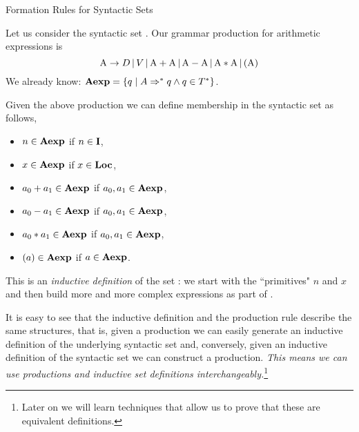 \documentclass{beamer}
\begin{document}

\begin{frame}{Formation Rules for Syntactic Sets}
\scriptsize

Let us consider the syntactic set .  Our grammar production for arithmetic expressions is
\[
\mbox{A} \rightarrow D \,|\, V \,|\, \mbox{A} +\mbox{A} \,|\, \mbox{A} - \mbox{A} \,|\,
	\mbox{A} * \mbox{A}\,|\, ( \mbox{A} )
\]
We already know: $\mbox{\bf Aexp} = \{ q \mid A \Rightarrow^* q \wedge q \in T^*\}$.

\vspace{.1in}
Given the above production we can define membership in the syntactic set as follows,
\begin{minipage}[t]{2in}
\begin{itemize}
\item $n \in  \mbox{\bf Aexp}$ if $n \in \mbox{\bf I}$,
\item $x \in \mbox{\bf Aexp}$ if $x\in \mbox{\bf Loc}$,
\item $a_0 + a_1 \in \mbox{\bf Aexp}$ if $a_0, a_1 \in \mbox{\bf Aexp}$,
\end{itemize}
\end{minipage}
\begin{minipage}[t]{2in}
\begin{itemize}
\item $a_0 - a_1 \in \mbox{\bf Aexp}$ if $a_0, a_1 \in \mbox{\bf Aexp}$,
\item $a_0 * a_1 \in \mbox{\bf Aexp}$ if $a_0, a_1 \in \mbox{\bf Aexp}$,
\item $( a )\in \mbox{\bf Aexp}$ if $a \in \mbox{\bf Aexp}$.
\end{itemize}
\end{minipage}

\vspace{.1in}

This is an {\em inductive definition} of the set : we start with the ``primitives" $n$ and
$x$ and then build more and more complex expressions as part of .

\vspace{.1in}

It is easy to see that the inductive definition and the production rule describe the same structures, that is,
given a production we can easily generate an inductive definition of the underlying syntactic set and, conversely, given an inductive definition of the syntactic set we can construct a production.
{\em This means we can use productions and inductive set definitions interchangeably.}\footnote{\tiny Later on we will learn techniques that allow us to prove that these are equivalent definitions.}

\end{frame}
\end{document}
